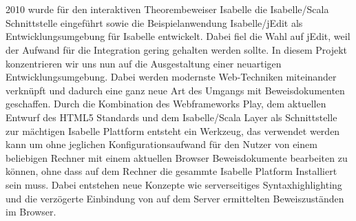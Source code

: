 \section*{\abstractname}

2010 wurde für den interaktiven Theorembeweiser Isabelle die Isabelle/Scala Schnittstelle eingeführt
sowie die Beispielanwendung Isabelle/jEdit als Entwicklungsumgebung für Isabelle entwickelt. Dabei
fiel die Wahl auf jEdit, weil der Aufwand für die Integration gering gehalten werden sollte. In
diesem Projekt konzentrieren wir uns nun auf die Ausgestaltung einer neuartigen
Entwicklungsumgebung. Dabei werden modernste Web-Techniken miteinander verknüpft und dadurch eine
ganz neue Art des Umgangs mit Beweisdokumenten geschaffen. Durch die Kombination des Webframeworks
Play, dem aktuellen Entwurf des HTML5 Standards und dem Isabelle/Scala Layer als Schnittstelle zur
mächtigen Isabelle Plattform entsteht ein Werkzeug, das verwendet werden kann um ohne jeglichen
Konfigurationsaufwand für den Nutzer von einem beliebigen Rechner mit einem aktuellen Browser
Beweisdokumente bearbeiten zu können, ohne dass auf dem Rechner die gesammte Isabelle Platform
Installiert sein muss. Dabei entstehen neue Konzepte wie serverseitiges Syntaxhighlighting und die
verzögerte Einbindung von auf dem Server ermittelten Beweiszuständen im Browser.

